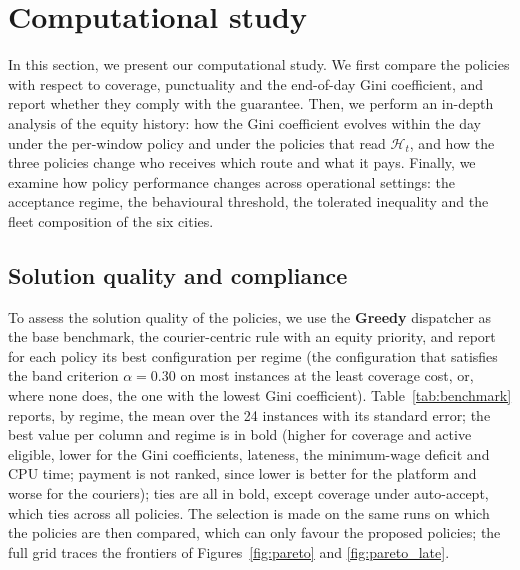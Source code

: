 \documentclass[a4paper,11pt,review,3p,authoryear]{elsarticle}
\newcommand{\Hist}{\mathcal{H}}
\begin{document}
\section{Computational study}
\label{sec:computational_study}

In this section, we present our computational study. We first compare the policies with respect to coverage, punctuality and the end-of-day Gini coefficient, and report whether they comply with the guarantee. Then, we perform an in-depth analysis of the equity history: how the Gini coefficient evolves within the day under the per-window policy and under the policies that read $\Hist_t$, and how the three policies change who receives which route and what it pays. Finally, we examine how policy performance changes across operational settings: the acceptance regime, the behavioural threshold, the tolerated inequality and the fleet composition of the six cities.

\subsection{Solution quality and compliance}
\label{sec:results_quality}

To assess the solution quality of the policies, we use the \textbf{Greedy} dispatcher as the base benchmark, the courier-centric rule with an equity priority, and report for each policy its best configuration per regime (the configuration that satisfies the band criterion $\alpha = 0.30$ on most instances at the least coverage cost, or, where none does, the one with the lowest Gini coefficient). Table~\ref{tab:benchmark} reports, by regime, the mean over the 24 instances with its standard error; the best value per column and regime is in bold (higher for coverage and active eligible, lower for the Gini coefficients, lateness, the minimum-wage deficit and CPU time; payment is not ranked, since lower is better for the platform and worse for the couriers); ties are all in bold, except coverage under auto-accept, which ties across all policies. The selection is made on the same runs on which the policies are then compared, which can only favour the proposed policies; the full grid traces the frontiers of Figures~\ref{fig:pareto} and \ref{fig:pareto_late}.
\end{document}
